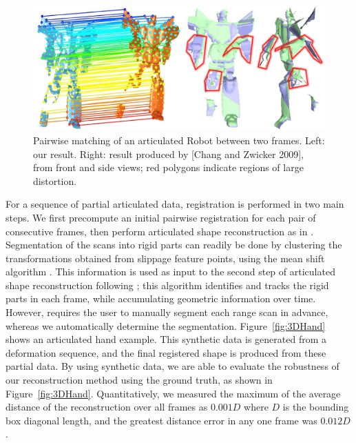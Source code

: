 \begin{figure}[t!]
\centering
  \includegraphics[width=0.95\linewidth]{figures/Robot.pdf}
  \caption{Pairwise matching of an articulated Robot between two frames.
           Left: our result. Right: result produced by [Chang and Zwicker 2009], from front and side views; red polygons indicate regions of large distortion.}
\label{fig:3DRobot}
\end{figure}

For a sequence of partial articulated data, registration is performed in two main steps.
We first precompute an initial pairwise registration for each pair of consecutive frames, then perform articulated shape reconstruction as in \cite{Pekelny08}.
Segmentation of the scans into rigid parts can readily be done by clustering the transformations obtained from slippage feature points,
using the mean shift algorithm \cite{Comaniciu02}.
This information is used as input to the second step of articulated shape reconstruction following \cite{Pekelny08};
this algorithm identifies and tracks the rigid parts in each frame, while accumulating  geometric information over time.
However, \cite{Pekelny08} requires the user to manually segment each range scan in advance, whereas we automatically determine  the segmentation.
Figure~\ref{fig:3DHand} shows an articulated hand example.
This synthetic data is generated from a deformation sequence, and the final registered shape is produced from these partial data.
By using synthetic data, we are able to evaluate the robustness of our reconstruction method using the ground truth, as shown in Figure~\ref{fig:3DHand}.
Quantitatively, we measured the maximum of the average distance of the reconstruction over all frames as $0.001 D$ where $D$ is the bounding box diagonal length, and
the greatest distance error in any one frame was $0.012 D$.

